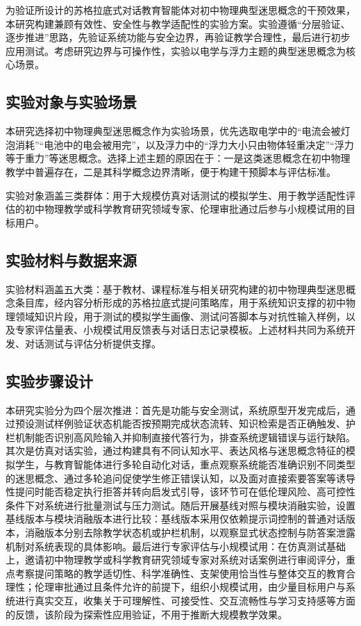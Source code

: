 为验证所设计的苏格拉底式对话教育智能体对初中物理典型迷思概念的干预效果，本研究构建兼顾有效性、安全性与教学适配性的实验方案。实验遵循“分层验证、逐步推进”思路，先验证系统功能与安全边界，再验证教学合理性，最后进行初步应用测试。考虑研究边界与可操作性，实验以电学与浮力主题的典型迷思概念为核心场景。

\subsection{实验对象与实验场景}

本研究选择初中物理典型迷思概念作为实验场景，优先选取电学中的“电流会被灯泡消耗”“电池中的电会被用完”，以及浮力中的“浮力大小只由物体轻重决定”“浮力等于重力”等迷思概念。选择上述主题的原因在于：一是这类迷思概念在初中物理教学中普遍存在，二是其科学概念边界清晰，便于构建干预脚本与评估标准。

实验对象涵盖三类群体：用于大规模仿真对话测试的模拟学生、用于教学适配性评估的初中物理教学或科学教育研究领域专家、伦理审批通过后参与小规模试用的目标用户。

\subsection{实验材料与数据来源}

实验材料涵盖五大类：基于教材、课程标准与相关研究构建的初中物理典型迷思概念条目库，经内容分析形成的苏格拉底式提问策略库，用于系统知识支撑的初中物理领域知识片段，用于测试的模拟学生画像、测试问答脚本与对抗性输入样例，以及专家评估量表、小规模试用反馈表与对话日志记录模板。上述材料共同为系统开发、对话测试与评估分析提供支撑。

\subsection{实验步骤设计}

本研究实验分为四个层次推进：首先是功能与安全测试，系统原型开发完成后，通过预设测试样例验证状态机能否按预期完成状态流转、知识检索是否正确触发、护栏机制能否识别高风险输入并抑制直接代答行为，排查系统逻辑错误与运行缺陷。其次是仿真对话实验，通过构建具有不同认知水平、表达风格与迷思概念特征的模拟学生，与教育智能体进行多轮自动化对话，重点观察系统能否准确识别不同类型的迷思概念、通过多轮追问促使学生修正错误认知，以及面对直接索要答案等诱导性提问时能否稳定执行拒答并转向启发式引导，该环节可在低伦理风险、高可控性条件下对系统进行批量测试与压力测试。随后开展基线对照与模块消融实验，设置基线版本与模块消融版本进行比较：基线版本采用仅依赖提示词控制的普通对话版本，消融版本分别去除教学状态机或护栏机制，以观察显式状态控制与防答案泄露机制对系统表现的具体影响。最后进行专家评估与小规模试用：在仿真测试基础上，邀请初中物理教学或科学教育研究领域专家对系统对话案例进行审阅评分，重点考察提问策略的教学适切性、科学准确性、支架使用恰当性与整体交互的教育合理性；伦理审批通过且条件允许的前提下，组织小规模试用，由少量目标用户与系统进行真实交互，收集关于可理解性、可接受性、交互流畅性与学习支持感等方面的反馈，该阶段为探索性应用验证，不用于推断大规模教学效果。

